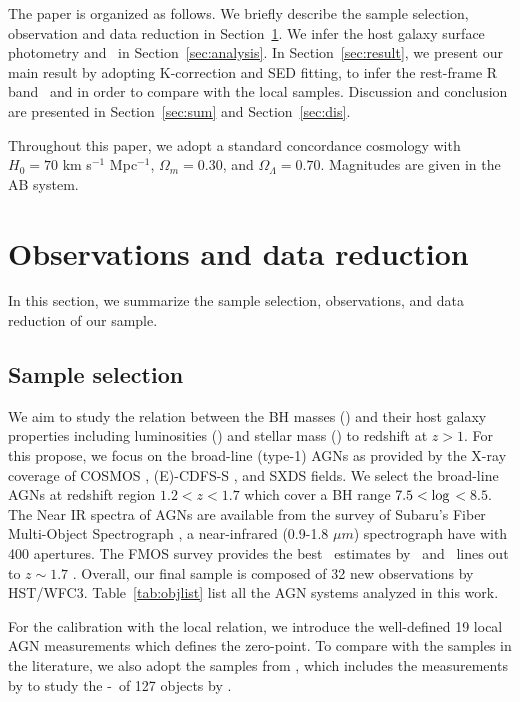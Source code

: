\documentclass[apj]{emulateapj}
\begin{document}
The paper is organized as follows. We briefly describe the sample selection, observation and data reduction in Section~\ref{sec:data}. We infer the host galaxy surface photometry and \mbh\ in Section~\ref{sec:analysis}. In Section~\ref{sec:result}, we present our main result by adopting K-correction and SED fitting, to infer the rest-frame R band \lhost\ and \smass in order to compare with the local samples. Discussion and conclusion are presented in Section~\ref{sec:sum} and Section~\ref{sec:dis}. 

Throughout this paper, we adopt a standard concordance cosmology with $H_0= 70$ km s$^{-1}$ Mpc$^{-1}$, $\Omega{_m} = 0.30$, and $\Omega{_\Lambda} =
0.70$. Magnitudes are given in the AB system.

\section{Observations and data reduction}
\label{sec:data}
In this section, we summarize the sample selection, observations, and data reduction of our sample. 

\subsection{Sample selection}

We aim to study the relation between the BH masses (\mbh) and their host galaxy properties including luminosities (\lhost) and stellar mass (\smass) to redshift at $z>1$. For this propose, we focus on the broad-line (type-1) AGNs as provided by the X-ray coverage of COSMOS \citep{Civano2016}, (E)-CDFS-S \citep{Lehmer2005, Xue2011}, and SXDS \citep{Ueda2008} fields. We select the broad-line AGNs at redshift region $1.2<z<1.7$ which cover a BH range $7.5<{\rm log}$\mbh $<8.5$. The Near IR spectra of AGNs are available from the survey of Subaru's Fiber Multi-Object Spectrograph \citep[FMOS, ][]{Kimura2010, Schulze2018}, a near-infrared (0.9-1.8 $\mu m$) spectrograph have with 400 apertures. The FMOS survey provides the best \mbh\ estimates by \halpha\ and \hbeta\ lines out to $z\sim1.7$ \citep{Greene2005, Matsuoka2013, Nobuta2012}. Overall, our final sample is composed of 32 new observations by HST/WFC3. Table~\ref{tab:objlist} list all the AGN systems analyzed in this work.

For the calibration with the local relation, we introduce the well-defined 19 local AGN measurements \citep{Ben++10, Peterson2004} which defines the zero-point. 
To compare with the samples in the literature, we also adopt the samples from \citet{Ding2017b}, which includes the measurements by \citet{Pen++06qsob, Park15} to study the \mbh-\lhost\ of 127 objects by \hst.
\end{document}
